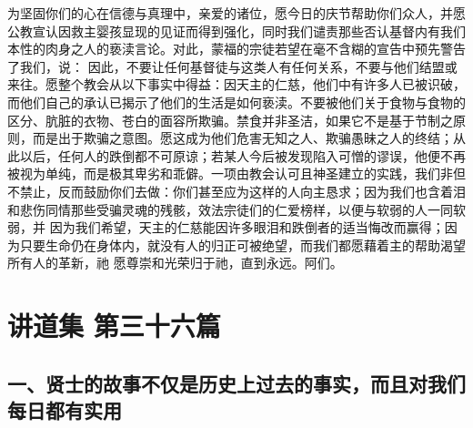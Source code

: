 为坚固你们的心在信德与真理中，亲爱的诸位，愿今日的庆节帮助你们众人，并愿公教宣认因救主婴孩显现的见证而得到强化，同时我们谴责那些否认基督内有我们本性的肉身之人的亵渎言论。对此，蒙福的宗徒若望在毫不含糊的宣告中预先警告了我们，说： 因此，不要让任何基督徒与这类人有任何关系，不要与他们结盟或来往。愿整个教会从以下事实中得益：因天主的仁慈，他们中有许多人已被识破，而他们自己的承认已揭示了他们的生活是如何亵渎。不要被他们关于食物与食物的区分、肮脏的衣物、苍白的面容所欺骗。禁食并非圣洁，如果它不是基于节制之原则，而是出于欺骗之意图。愿这成为他们危害无知之人、欺骗愚昧之人的终结；从此以后，任何人的跌倒都不可原谅；若某人今后被发现陷入可憎的谬误，他便不再被视为单纯，而是极其卑劣和乖僻。一项由教会认可且神圣建立的实践，我们非但不禁止，反而鼓励你们去做：你们甚至应为这样的人向主恳求；因为我们也含着泪和悲伤同情那些受骗灵魂的残骸，效法宗徒们的仁爱榜样，以便与软弱的人一同软弱，并 因为我们希望，天主的仁慈能因许多眼泪和跌倒者的适当悔改而赢得；因为只要生命仍在身体内，就没有人的归正可被绝望，而我们都愿藉着主的帮助渴望所有人的革新，祂 愿尊崇和光荣归于祂，直到永远。阿们。\par



\section{讲道集 第三十六篇}

\par


\subsection{一、贤士的故事不仅是历史上过去的事实，而且对我们每日都有实用}

